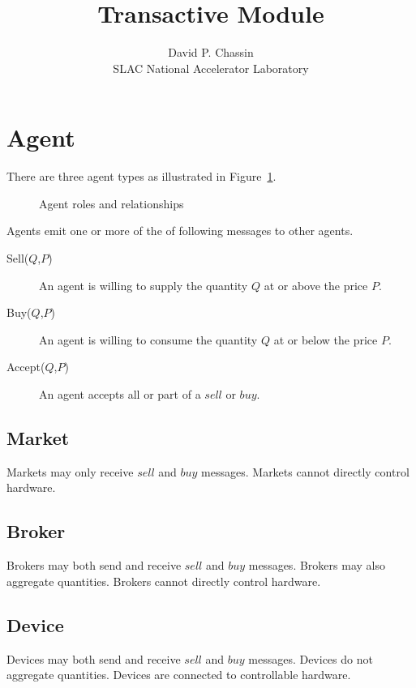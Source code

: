 \documentclass[10pt,letterpaper]{article}
\author{David P. Chassin \\ SLAC National Accelerator Laboratory}
\title{Transactive Module}
\begin{document}
\maketitle

\section{Agent}

There are three agent types as illustrated in Figure~\ref{fig:agents}.
\begin{figure}[!h]
	\centerline{}
	\caption{Agent roles and relationships}
	\label{fig:agents}
\end{figure}

Agents emit one or more of the of following messages to other agents.
\begin{description}
\item[Sell($Q$,$P$)] An agent is willing to supply the quantity $Q$ at or above the price $P$.
\item[Buy($Q$,$P$)] An agent is willing to consume the quantity $Q$ at or below the price $P$.
\item[Accept($Q$,$P$)] An agent accepts all or part of a $sell$ or $buy$.
\end{description}

\subsection{Market}

Markets may only receive $sell$ and $buy$ messages. Markets cannot directly control hardware.

\subsection{Broker}

Brokers may both send and receive $sell$ and $buy$ messages. Brokers may also aggregate quantities.  Brokers cannot directly control hardware. 

\subsection{Device}

Devices may both send and receive $sell$ and $buy$ messages. Devices do not aggregate quantities. Devices are connected to controllable hardware.
\end{document}
